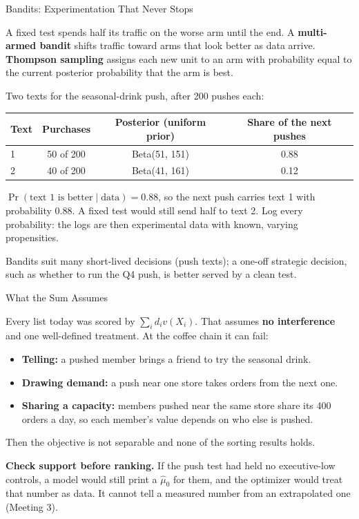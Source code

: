 \documentclass[aspectratio=169, 11pt, handout]{beamer}
\begin{document}
\begin{frame}{Bandits: Experimentation That Never Stops}

A fixed test spends half its traffic on the worse arm until the end. A \textbf{multi-armed bandit} shifts traffic toward arms that look better as data arrive. \textbf{Thompson sampling} assigns each new unit to an arm with probability equal to the current posterior probability that the arm is best.

\medskip

Two texts for the seasonal-drink push, after 200 pushes each:

\begin{center}
\small
\begin{tabular}{lccc}
\toprule
\textbf{Text} & \textbf{Purchases} & \textbf{Posterior (uniform prior)} & \textbf{Share of the next pushes} \\
\midrule
1 & 50 of 200 & Beta(51, 151) & 0.88 \\
2 & 40 of 200 & Beta(41, 161) & 0.12 \\
\bottomrule
\end{tabular}
\end{center}

$\Pr(\text{text 1 is better} \mid \text{data}) = 0.88$, so the next push carries text 1 with probability 0.88. A fixed test would still send half to text 2. Log every probability: the logs are then experimental data with known, varying propensities.

\medskip

\small Bandits suit many short-lived decisions (push texts); a one-off strategic decision, such as whether to run the Q4 push, is better served by a clean test.
\end{frame}

\begin{frame}{What the Sum Assumes}

Every list today was scored by $\sum_i d_i v(X_i)$. That assumes \textbf{no interference} and one well-defined treatment. At the coffee chain it can fail:
\begin{itemize}
  \item \textbf{Telling:} a pushed member brings a friend to try the seasonal drink.
  \item \textbf{Drawing demand:} a push near one store takes orders from the next one.
  \item \textbf{Sharing a capacity:} members pushed near the same store share its 400 orders a day, so each member's value depends on who else is pushed.
\end{itemize}
Then the objective is not separable and none of the sorting results holds.

\bigskip

\textbf{Check support before ranking.} If the push test had held no executive-low controls, a model would still print a $\hat\mu_0$ for them, and the optimizer would treat that number as data. It cannot tell a measured number from an extrapolated one (Meeting 3).
\end{frame}
\end{document}
